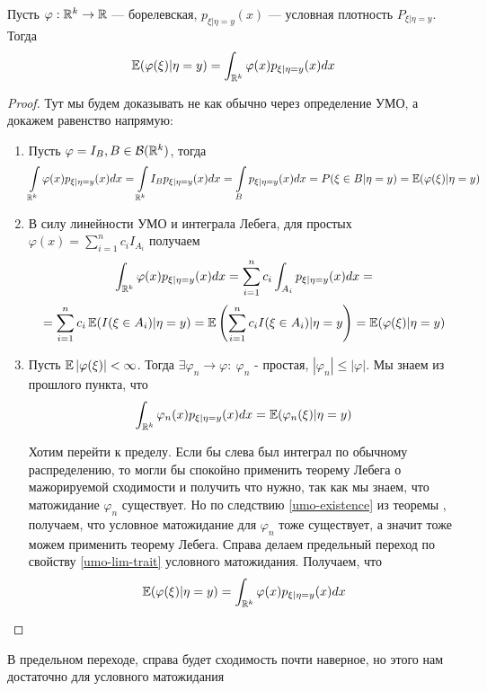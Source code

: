 \begin{statement}
    Пусть $\varphi: \mathbb{R}^k \rightarrow \mathbb{R}$ --- борелевская, $p_{\xi|\eta=y}(x)$ --- условная плотность $P_{\xi|\eta=y}$. Тогда 
    \[ \operatorname{\mathbb{E}}(\varphi(\xi)|\eta=y)=\int_{\mathbb{R}^k} \varphi(x) p_{\xi|\eta=y}(x)dx \]
\end{statement}

\begin{proof}
    Тут мы будем доказывать не как обычно через определение УМО, а докажем равенство напрямую:
    \begin{enumerate}
        \item Пусть $\varphi = I_B, B \in \mathcal{B}(\mathbb{R}^k)$, тогда
        $$\int\limits_{\mathbb{R}^k} \varphi(x) p_{\xi|\eta = y}(x) dx = \int\limits_{\mathbb{R}^k} I_B p_{\xi|\eta = y}(x) dx = \int\limits_B p_{\xi|\eta = y}(x) dx = P(\xi \in B | \eta = y) = \operatorname{\mathbb{E}}(\varphi(\xi)| \eta = y)$$
        
        \item В силу линейности УМО и интеграла Лебега, для простых $\varphi(x)=\sum_{i=1}^n c_i I_{A_i}$ получаем
        $$\int_{\mathbb{R}^k} \varphi(x) p_{\xi|\eta=y}(x) dx=\sum_{i=1}^n c_i \int_{A_i} p_{\xi|\eta=y}(x) dx=$$
        $$=\sum_{i=1}^n c_i \operatorname{\mathbb{E}} (I(\xi \in A_i) | \eta=y)=\operatorname{\mathbb{E}} \left(\sum_{i=1}^n c_i I(\xi \in A_i) | \eta = y\right)=\operatorname{\mathbb{E}}(\varphi(\xi)|\eta=y)$$
        
        \item Пусть $\operatorname{\mathbb{E}}|\varphi(\xi)| < \infty$. Тогда $\exists \varphi_n \rightarrow \varphi: \: \varphi_n$ - простая, $|\varphi_n| \leqslant |\varphi|$. Мы знаем из прошлого пункта, что
        \[ \int_{\mathbb{R}^k} \varphi_n(x) p_{\xi | \eta=y}(x)dx=\operatorname{\mathbb{E}}(\varphi_n(\xi) | \eta=y) \]
        
        Хотим перейти к пределу. Если бы слева был интеграл по обычному распределению, то могли бы спокойно применить теорему Лебега о мажорируемой сходимости и получить что нужно, так как мы знаем, что матожидание $\varphi_n$ существует. Но по следствию \ref{umo-existence} из теоремы , получаем, что условное матожидание для $\varphi_n$ тоже существует, а значит тоже можем применить теорему Лебега. Справа делаем предельный переход по свойству \ref{umo-lim-trait} условного матожидания. Получаем, что
        \[ \operatorname{\mathbb{E}}(\varphi(\xi) | \eta=y)=\int_{\mathbb{R}^k} \varphi(x) p_{\xi| \eta=y}(x) dx \]
\end{enumerate}
\end{proof}

\begin{lemmanote}
    В предельном переходе, справа будет сходимость почти наверное, но этого нам достаточно для условного матожидания
\end{lemmanote}
